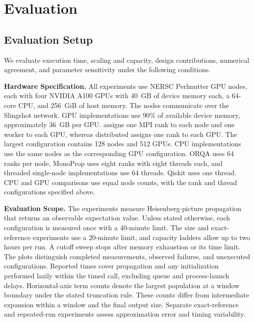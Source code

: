 \section{Evaluation}
\label{sec:eval}

\subsection{Evaluation Setup}
We evaluate execution time, scaling and capacity, design contributions, numerical agreement, and parameter sensitivity under the following conditions.

\noindent\textbf{Hardware Specification.}
All experiments use NERSC Perlmutter GPU nodes, each with four NVIDIA A100 GPUs with 40~GB of device memory each, a 64-core CPU, and 256~GiB of host memory.
The nodes communicate over the Slingshot network.
GPU implementations use 90\% of available device memory, approximately 36~GB per GPU.
\SectorQ assigns one MPI rank to each node and one worker to each GPU, whereas distributed \cuPP assigns one rank to each GPU.
The largest configuration contains 128 nodes and 512 GPUs.
CPU implementations use the same nodes as the corresponding GPU configuration.
ORQA uses 64 ranks per node, MonoProp uses eight ranks with eight threads each, and threaded single-node implementations use 64 threads.
Qiskit uses one thread.
CPU and GPU comparisons use equal node counts, with the rank and thread configurations specified above.

\noindent\textbf{Evaluation Scope.}
The experiments measure Heisenberg-picture propagation that returns an observable expectation value.
Unless stated otherwise, each configuration is measured once with a 40-minute limit.
The size and exact-reference experiments use a 20-minute limit, and capacity ladders allow \SectorQ up to two hours per run.
A cutoff sweep stops after memory exhaustion or its time limit.
The plots distinguish completed measurements, observed failures, and unexecuted configurations.
Reported times cover propagation and any initialization performed lazily within the timed call, excluding queue and process-launch delays.
Horizontal-axis term counts denote the largest population at a \SectorQ window boundary under the stated truncation rule.
These counts differ from intermediate expansion within a window and the final output size.
Separate exact-reference and repeated-run experiments assess approximation error and timing variability.

